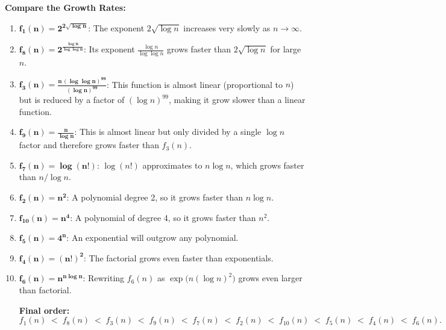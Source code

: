\documentclass[12pt]{article}
\begin{document}
\bigskip
\noindent \textbf{Compare the Growth Rates:}

\begin{enumerate}
    \item \(\boldsymbol{f_1(n)=2^{2\sqrt{\log n}}}\):  
    The exponent \(2\sqrt{\log n}\) increases very slowly as \(n\to\infty\).

    \item \(\boldsymbol{f_8(n)=2^{\frac{\log n}{\log \log n}}}\):  
    Its exponent \(\frac{\log n}{\log \log n}\) grows faster than \(2\sqrt{\log n}\) for large \(n\).

    \item \(\boldsymbol{f_3(n)=\frac{n\,(\log \log n)^{99}}{(\log n)^{99}}}\):  
    This function is almost linear (proportional to \(n\)) but is reduced by a factor of \((\log n)^{99}\), making it grow slower than a linear function.

    \item \(\boldsymbol{f_9(n)=\frac{n}{\log n}}\):  
    This is almost linear but only divided by a single \(\log n\) factor and therefore grows faster than \(f_3(n)\).

    \item \(\boldsymbol{f_7(n)=\log(n!)}\):  
    \(\log(n!)\) approximates to \(n\log n\), which grows faster than \(n/\log n\).

    \item \(\boldsymbol{f_2(n)=n^2}\):  
    A polynomial degree 2, so it grows faster than \(n\log n\).

    \item \(\boldsymbol{f_{10}(n)=n^4}\):  
    A polynomial of degree 4, so it grows faster than \(n^2\).

    \item \(\boldsymbol{f_5(n)=4^n}\):  
    An exponential will outgrow any polynomial.

    \item \(\boldsymbol{f_4(n)=(n!)^2}\):  
    The factorial grows even faster than exponentials.

    \item \(\boldsymbol{f_6(n)=n^{n \log n}}\):  
    Rewriting \(f_6(n)\) as \(\exp\bigl(n(\log n)^2\bigr)\) grows even larger than factorial.

\bigskip
\noindent \textbf{Final order:}\\[0.5em]

\[
\boxed{
f_1(n) \;<\; f_8(n) \;<\; f_3(n) \;<\; f_9(n) \;<\; f_7(n) \;<\; f_2(n) \;<\; f_{10}(n) \;<\; f_5(n) \;<\; f_4(n) \;<\; f_6(n).
}
\]


\end{enumerate}
\end{document}
